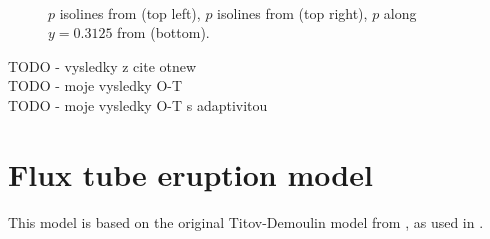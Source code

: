 \begin{figure}[H]
\centering
{}
\\
\caption{$p$ isolines from \cite{blast1} (top left), $p$ isolines from \cite{blast0} (top right), $p$ along $y = 0.3125$ from \cite{blast0} (bottom).}
\label{figure:otRef}
\end{figure}


TODO - vysledky z cite otnew\\
TODO - moje vysledky O-T\\
TODO - moje vysledky O-T s adaptivitou\\

\section{Flux tube eruption model}
This model is based on the original Titov-Demoulin model from \cite{td}, as used in \cite{miraClanek}.


